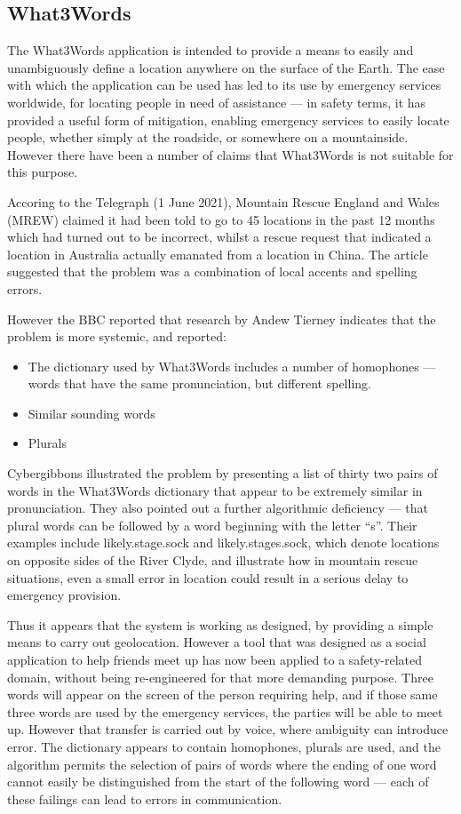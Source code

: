 \subsection{What3Words}\label{bkm:incacc:w3w}
The What3Words application is intended to provide a means to easily and unambiguously define a location anywhere on the surface of
the Earth. The ease with which the application can be used has led to its use by emergency services worldwide, for locating people in need of assistance --- in safety terms, it has provided a useful form of mitigation, enabling emergency services to easily locate people,
whether simply at the roadside, or somewhere on a mountainside.
However there have been a number of claims that What3Words is not suitable for this purpose.

Accoring to the Telegraph (1 June 2021),
Mountain Rescue England and Wales (MREW) claimed it had been told to go to 45 locations in the past 12 months which had turned out
to be incorrect, whilst a rescue request that indicated a location in Australia actually emanated from a location in China.
The article suggested that the problem was a combination of local accents and spelling errors.

However the BBC reported that research by Andew Tierney indicates that the problem is more systemic, and reported:
\begin{itemize}
\item The dictionary used by What3Words includes a number of homophones --- words that have the same pronunciation, but different spelling.
\item Similar sounding words
\item Plurals
\end{itemize}
Cybergibbons illustrated the problem by presenting a list of thirty two pairs of words in the What3Words dictionary that appear to
be extremely similar in pronunciation. They also pointed out a further algorithmic deficiency --- that plural words can be followed
by a word beginning with the letter ``s''. Their examples include likely.stage.sock and likely.stages.sock, which denote locations on opposite sides of the River Clyde, and illustrate how in mountain rescue situations, even a small error in location could result in
a serious delay to emergency provision.

Thus it appears that the system is working as designed, by providing a simple means to carry out geolocation.
However a tool that was designed as a social application to help friends meet up has now been applied to a safety-related domain,
without being re-engineered for that more demanding purpose.
Three words will appear on the screen of the person requiring help, and if those same three words are used by the emergency services,
the parties will be able to meet up.
However that transfer is carried out by voice, where ambiguity can introduce error.
The dictionary appears to contain homophones, plurals are used, and the algorithm permits the selection of pairs of words where the
ending of one word cannot easily be distinguished from the start of the following word --- each of these failings can lead to
errors in communication. 

